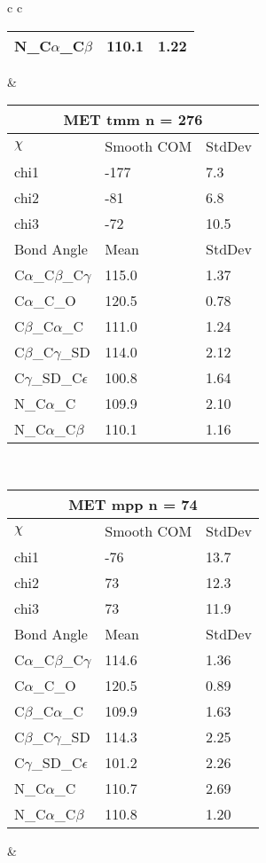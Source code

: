 \begin{longtable}{ c c }
\begin{tabular}{ l l l }
  N\_C$\alpha$\_C$\beta$ & 110.1 & 1.22\\
  \bottomrule
  \end{tabular}
  &
  \begin{tabular}{ l l l }
  \toprule
  \multicolumn{3}{c}{MET \textbf{tmm} n = 276} \\ \toprule
  $\chi$       & Smooth COM & StdDev \\ \midrule
  chi1 & -177 & 7.3 \\ 
  chi2 & -81 & 6.8 \\ 
  chi3 & -72 & 10.5 \\ \midrule
  Bond Angle   & Mean     & StdDev \\ \midrule
  C$\alpha$\_C$\beta$\_C$\gamma$ & 115.0 & 1.37\\
  C$\alpha$\_C\_O & 120.5 & 0.78\\
  C$\beta$\_C$\alpha$\_C & 111.0 & 1.24\\
  C$\beta$\_C$\gamma$\_SD & 114.0 & 2.12\\
  C$\gamma$\_SD\_C$\epsilon$ & 100.8 & 1.64\\
  N\_C$\alpha$\_C & 109.9 & 2.10\\
  N\_C$\alpha$\_C$\beta$ & 110.1 & 1.16\\
  \bottomrule
  \end{tabular}
  \\
  \begin{tabular}{ l l l }
  \toprule
  \multicolumn{3}{c}{MET \textbf{mpp} n = 74} \\ \toprule
  $\chi$       & Smooth COM & StdDev \\ \midrule
  chi1 & -76 & 13.7 \\ 
  chi2 & 73 & 12.3 \\ 
  chi3 & 73 & 11.9 \\ \midrule
  Bond Angle   & Mean     & StdDev \\ \midrule
  C$\alpha$\_C$\beta$\_C$\gamma$ & 114.6 & 1.36\\
  C$\alpha$\_C\_O & 120.5 & 0.89\\
  C$\beta$\_C$\alpha$\_C & 109.9 & 1.63\\
  C$\beta$\_C$\gamma$\_SD & 114.3 & 2.25\\
  C$\gamma$\_SD\_C$\epsilon$ & 101.2 & 2.26\\
  N\_C$\alpha$\_C & 110.7 & 2.69\\
  N\_C$\alpha$\_C$\beta$ & 110.8 & 1.20\\
  \bottomrule
  \end{tabular}
  &
  \begin{tabular}{ l l l }

\end{tabular}
\end{longtable}
